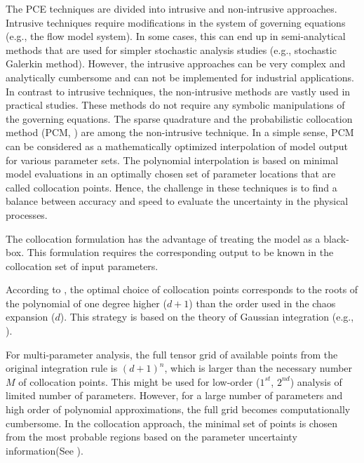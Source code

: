 The PCE techniques are divided into intrusive
\cite{Ghanem1993,Matthies2005,Xiu2003} and non-intrusive
\cite{Keese2003,Isukapalli1998,nLi2007,oladyshkinintegrative} approaches.
Intrusive techniques require modifications in the system of governing
equations (e.g., the flow model system). In some cases, this can end up in semi-analytical methods that are
used for simpler stochastic analysis studies (e.g., stochastic Galerkin
method). However, the intrusive approaches can be very complex and analytically
cumbersome and can not be implemented for industrial applications. In contrast
to intrusive techniques, the non-intrusive methods are vastly used in practical
studies. These methods do not require any symbolic manipulations of the
governing equations. The sparse quadrature and the probabilistic collocation
method (PCM, \cite{nLi2007,oladyshkinintegrative}) are among the non-intrusive
technique. In a simple sense, PCM can be considered as a mathematically
optimized interpolation of model output for various parameter sets. The
polynomial interpolation is based on minimal model evaluations in an optimally
chosen set of parameter locations that are called collocation points. Hence, the challenge in these techniques is to find a balance between accuracy and speed
to evaluate the uncertainty in the physical processes.

The collocation formulation has the advantage of treating the model as a
black-box. This formulation requires the corresponding output to be known in
the collocation set of input parameters.

According to \cite{Villadsen1978}, the optimal choice of collocation
points corresponds to the roots of the polynomial of one degree higher ($d+1$)
than the order used in the chaos expansion ($d$). This strategy is based on the
theory of Gaussian integration (e.g., \cite{Abramowitz1965}). 

For multi-parameter analysis, the full tensor grid of available points from the
original integration rule is $(d+1)^n$, which is larger than the necessary
number
$M$ of collocation points. This might be used for low-order
($1^{st}$, $2^{nd}$) analysis of limited number of parameters. However, for
a large number of parameters and high order of polynomial approximations, the
full grid becomes computationally cumbersome. In the collocation approach,
the minimal set of points is chosen from the most probable regions based on the parameter uncertainty information(See
\cite{nLi2007,oladyshkinintegrative,oladyshkin2011concept}). 

